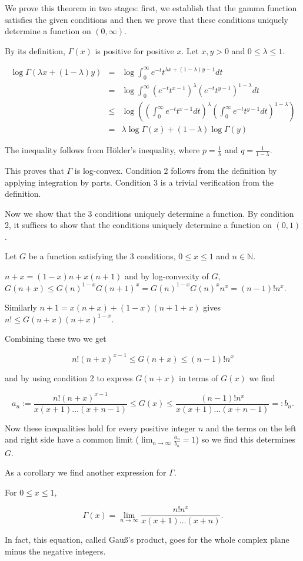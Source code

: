 \documentclass[12pt]{article}
\begin{document}
We prove this theorem in two stages: first, we establish that the gamma function satisfies the given conditions and then we prove that these conditions uniquely determine a function on $(0,\infty)$.

By its definition, $\Gamma(x)$ is positive for positive $x$. Let $x,y>0$ and $0\leq \lambda \leq 1$. 

\begin{eqnarray*}
\log \Gamma(\lambda x+(1-\lambda)y) &=& \log \int_0^\infty e^{-t}t^{\lambda x+(1-\lambda)y-1}dt\\
&=&\log\int_0^\infty (e^{-t}t^{x-1})^\lambda (e^{-t}t^{y-1})^{1-\lambda}dt\\
&\leq&\log ((\int_0^\infty e^{-t}t^{x-1}dt)^\lambda(\int_0^\infty e^{-t}t^{y-1}dt)^{1-\lambda})\\
&=& \lambda\log\Gamma(x)+(1-\lambda)\log\Gamma(y)
\end{eqnarray*}

The inequality follows from H\"older's inequality, where $p=\frac{1}{\lambda}$ and $q=\frac{1}{1-\lambda}$.

This proves that $\Gamma$ is log-convex. Condition 2 follows from the definition by applying integration by parts. Condition 3 is a trivial verification from the definition.

Now we show that the 3 conditions uniquely determine a function. By condition 2, it suffices to show that the conditions uniquely determine a function on $(0,1)$.

Let $G$ be a function satisfying the 3 conditions, $0\leq x\leq 1$ and $n\in{\mathbb N}$.

$n+x=(1-x)n+x(n+1)$ and by log-convexity of $G$, $G(n+x)\leq G(n)^{1-x}G(n+1)^x=G(n)^{1-x}G(n)^xn^x=(n-1)!n^x$.

Similarly $n+1=x(n+x)+(1-x)(n+1+x)$ gives $n!\leq G(n+x)(n+x)^{1-x}$.

Combining these two we get

$$ n!(n+x)^{x-1}\leq G(n+x) \leq (n-1)!n^x $$

and by using condition 2 to express $G(n+x)$ in terms of $G(x)$ we find


$$ a_n:=\frac{n!(n+x)^{x-1}}{x(x+1)\dots(x+n-1)}\leq G(x) \leq \frac{(n-1)!n^x}{x(x+1)\dots(x+n-1)}=:b_n.$$

Now these inequalities hold for every positive integer $n$ and the terms on the left and right side have a common limit ($\lim_{n\rightarrow\infty}\frac{a_n}{b_n}=1$) so we find this determines $G$.

As a corollary we find another expression for $\Gamma$.

For $0\leq x\leq 1$,

$$ \Gamma(x)=\lim_{n\rightarrow\infty} \frac{n!n^x}{x(x+1)\dots(x+n)}.$$

In fact, this equation, called Gau\ss's product, goes for the whole complex plane minus the negative integers.
\end{document}
